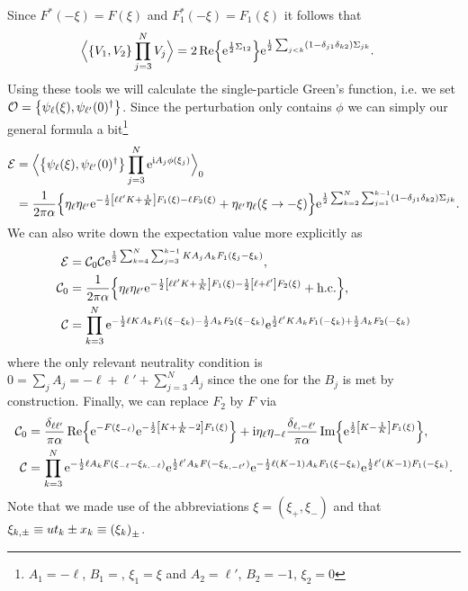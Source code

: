 \documentclass[english, parskip=full]{scrartcl}
\begin{document}
Since $F^\ast(-\xi)=F(\xi)$ and $F_1^\ast(-\xi) = F_1(\xi)$ it follows that
\begin{align}
\bra[\Big]{\klc*{V_1, V_2} \prod_{j=3}^NV_j} &= 2\Re \klc*{\powe{\frac{1}{2} \Sigma_{12}}} \powe{\frac{1}{2} \sum_{j<k} \kla*{1 - \delta_{j1} \delta_{k2}} \Sigma_{jk}}.
\end{align}
Using these tools we will calculate the single-particle Green's function, i.e. we set $\mathcal{O} = \klc*{\psi_\ell(\xi), \psi_{\ell'}(0)^\dagger}$.
Since the perturbation only contains $\phi$ we can simply our general formula a bit\footnote{$A_{1} = -\ell$, $B_{1} = $, $\xi_{1} = \xi$ and $A_{2} = \ell'$, $B_{2} = -1$, $\xi_{2} = 0$}
\begin{align}
\mathcal{E} &= \bra[\Big]{\klc*{\psi_\ell(\xi), \psi_{\ell'}(0)^\dagger} \prod_{j=3}^N \powe{\i A_j\phi(\xi_j)} }_0 \\
&= \frac{1}{2\pi\alpha} \klc*{\eta_\ell\eta_{\ell'} \powe{-\frac{1}{2} \klb*{\ell\ell' K + \frac{1}{K}}F_1(\xi) - \ell F_2(\xi)} + \eta_{\ell'}\eta_\ell \kla*{\xi \rightarrow -\xi}} \powe{\frac{1}{2} \sum_{k=2}^{N} \sum_{j=1}^{k-1} \kla*{1 - \delta_{j1} \delta_{k2}} \Sigma_{jk}}.
\end{align}
We can also write down the expectation value more explicitly as
\begin{align}
\mathcal{E} &= \mathcal{C}_0 \mathcal{C} \powe{\frac{1}{2} \sum_{k=4}^N \sum_{j=3}^{k-1} KA_jA_kF_1(\xi_j-\xi_k)},\\
\mathcal{C}_0 &= \frac{1}{2\pi\alpha} \klc*{\eta_\ell \eta_{\ell'} \powe{-\frac{1}{2} \klb*{\ell\ell' K + \frac{1}{K}}F_1(\xi) - \frac{1}{2} \klb*{\ell + \ell'} F_2(\xi)} + \hc},\\
\mathcal{C} &= \prod_{k=3}^N \powe{-\frac{1}{2} \ell K A_k F_1(\xi - \xi_k) - \frac{1}{2} A_k F_2(\xi - \xi_k)} \powe{\frac{1}{2} \ell' K A_k F_1(-\xi_k) + \frac{1}{2} A_k F_2(-\xi_k)}
\end{align}
where the only relevant neutrality condition is $0=\sum_jA_j = -\ell + \ell' + \sum_{j=3}^N A_j$ since the one for the $B_j$ is met by construction.
Finally, we can replace $F_2$ by $F$ via
\begin{align}
\mathcal{C}_0 &= \frac{\delta_{\ell\ell'}}{\pi\alpha} \Re\klc*{\powe{- F(\xi_{-\ell})} \powe{-\frac{1}{2} \klb*{K + \frac{1}{K} - 2}F_1(\xi)}} + \i\eta_\ell\eta_{-\ell} \frac{\delta_{\ell,-\ell'}}{\pi\alpha} \Im\klc*{\powe{\frac{1}{2} \klb*{K - \frac{1}{K}} F_1(\xi)}},\\
\mathcal{C} &= \prod_{k=3}^N \powe{-\frac{1}{2} \ell A_k F\kla{\xi_{-\ell} - \xi_{k,-\ell}}} \powe{\frac{1}{2} \ell'A_k F\kla{-\xi_{k,-\ell'}}} \powe{-\frac{1}{2} \ell (K-1) A_k F_1(\xi - \xi_k)} \powe{\frac{1}{2} \ell' (K-1) F_1(-\xi_k)}.
\end{align}
Note that we made use of the abbreviations $\xi = (\xi_+,\xi_-)$ and that $\xi_{k,\pm} \equiv ut_k \pm x_k \equiv \kla*{\xi_k}_\pm$.
\end{document}
